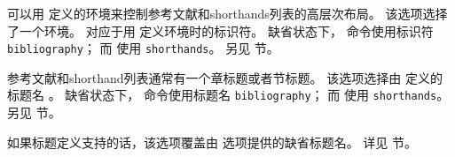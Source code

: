 \begin{optionlist*}



可以用  定义的环境来控制参考文献和shorthands列表的高层次布局。
该选项选择了一个环境。
 对应于用  定义环境时的标识符。
缺省状态下， 命令使用标识符 \texttt{bibliography}；
而  使用 \texttt{shorthands}。
另见  节。




参考文献和shorthand列表通常有一个章标题或者节标题。
该选项选择由  定义的标题名 。
缺省状态下， 命令使用标题名 \texttt{bibliography}；
而  使用 \texttt{shorthands}。
另见  节。



如果标题定义支持的话，该选项覆盖由  选项提供的缺省标题名。
详见  节。




\end{optionlist*}
